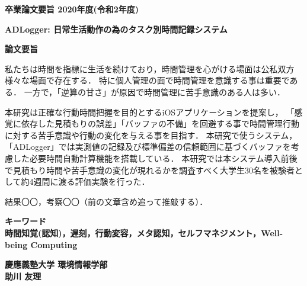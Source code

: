 \begin{center}
\textbf{\Large 卒業論文要旨 2020年度(令和2年度)}

\vspace{6.18mm}

\textbf{\Large ADLogger: 日常生活動作の為のタスク別時間記録システム}
\end{center}

\vspace{10mm}

\begin{flushleft}
\textbf{論文要旨}\\
\end{flushleft}
私たちは時間を指標に生活を続けており，時間管理を心がける場面は公私双方様々な場面で存在する．
特に個人管理の面で時間管理を意識する事は重要である．
一方で，「逆算の甘さ」が原因で時間管理に苦手意識のある人は多い．

本研究は正確な行動時間把握を目的とするiOSアプリケーションを提案し，
「感覚に依存した見積もりの誤差」「バッファの不備」を回避する事で時間管理行動に対する苦手意識や行動の変化を与える事を目指す．
本研究で使うシステム，「ADLogger」では実測値の記録及び標準偏差の信頼範囲に基づくバッファを考慮した必要時間自動計算機能を搭載している．
本研究では本システム導入前後で見積もり時間や苦手意識の変化が現れるかを調査すべく大学生30名を被験者として約4週間に渡る評価実験を行った．

結果〇〇，考察〇〇（前の文章含め追って推敲する）．

\begin{flushleft}
\textbf{キーワード}\\
\textbf{時間知覚(認知)，遅刻，行動変容，メタ認知，セルフマネジメント，Well-being Computing}

\end{flushleft}

\begin{flushright}
\textbf{慶應義塾大学 環境情報学部}\\
\textbf{助川 友理}
\end{flushright}
\newpage

